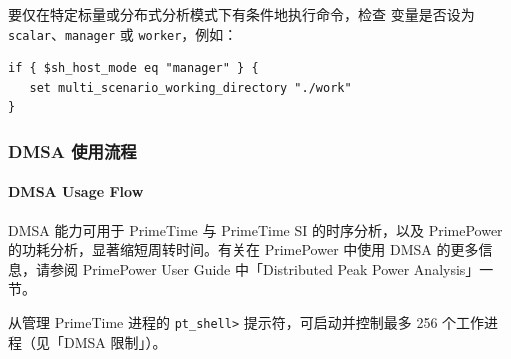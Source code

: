 要仅在特定标量或分布式分析模式下有条件地执行命令，检查  变量是否设为 \texttt{scalar}、\texttt{manager} 或 \texttt{worker}，例如：
\begin{lstlisting}
if { $sh_host_mode eq "manager" } {
   set multi_scenario_working_directory "./work"
}
\end{lstlisting}

\subsubsection{DMSA 使用流程}
\paragraph*{DMSA Usage Flow}

DMSA 能力可用于 PrimeTime 与 PrimeTime SI 的时序分析，以及 PrimePower 的功耗分析，显著缩短周转时间。有关在 PrimePower 中使用 DMSA 的更多信息，请参阅 PrimePower User Guide 中「Distributed Peak Power Analysis」一节。

从管理 PrimeTime 进程的 \texttt{pt\_shell>} 提示符，可启动并控制最多 256 个工作进程（见「DMSA 限制」）。


